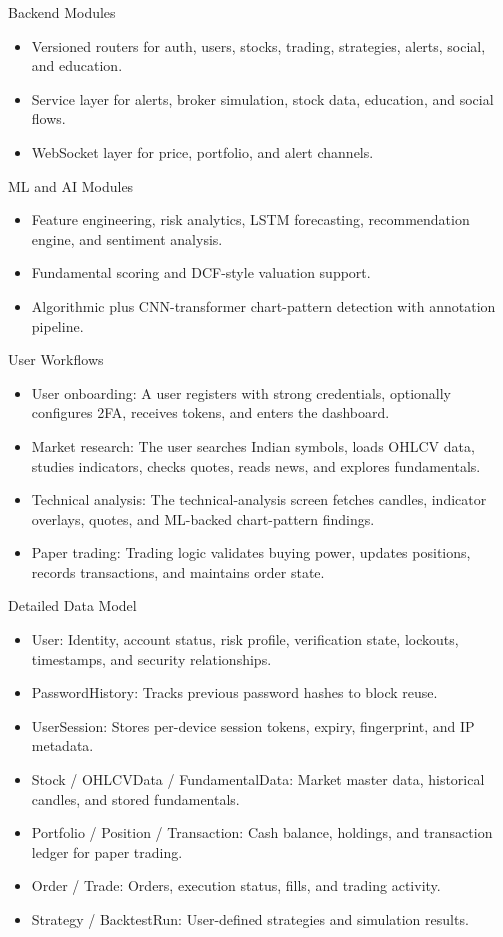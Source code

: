 \documentclass{beamer}
\begin{document}
\begin{frame}{Backend Modules}
\begin{itemize}
\item Versioned routers for auth, users, stocks, trading, strategies, alerts, social, and education.
\item Service layer for alerts, broker simulation, stock data, education, and social flows.
\item WebSocket layer for price, portfolio, and alert channels.
\end{itemize}
\end{frame}
\begin{frame}{ML and AI Modules}
\begin{itemize}
\item Feature engineering, risk analytics, LSTM forecasting, recommendation engine, and sentiment analysis.
\item Fundamental scoring and DCF-style valuation support.
\item Algorithmic plus CNN-transformer chart-pattern detection with annotation pipeline.
\end{itemize}
\end{frame}
\begin{frame}{User Workflows}
\begin{itemize}
\item User onboarding: A user registers with strong credentials, optionally configures 2FA, receives tokens, and enters the dashboard.
\item Market research: The user searches Indian symbols, loads OHLCV data, studies indicators, checks quotes, reads news, and explores fundamentals.
\item Technical analysis: The technical-analysis screen fetches candles, indicator overlays, quotes, and ML-backed chart-pattern findings.
\item Paper trading: Trading logic validates buying power, updates positions, records transactions, and maintains order state.
\end{itemize}
\end{frame}
\begin{frame}{Detailed Data Model}
\begin{itemize}
\item User: Identity, account status, risk profile, verification state, lockouts, timestamps, and security relationships.
\item PasswordHistory: Tracks previous password hashes to block reuse.
\item UserSession: Stores per-device session tokens, expiry, fingerprint, and IP metadata.
\item Stock / OHLCVData / FundamentalData: Market master data, historical candles, and stored fundamentals.
\item Portfolio / Position / Transaction: Cash balance, holdings, and transaction ledger for paper trading.
\item Order / Trade: Orders, execution status, fills, and trading activity.
\item Strategy / BacktestRun: User-defined strategies and simulation results.
\end{itemize}
\end{frame}
\end{document}
